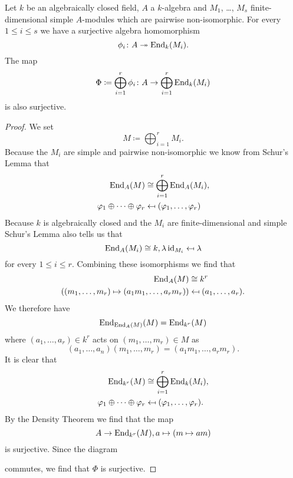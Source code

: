 \begin{lem}\label{lem: map into sum endomorphisms surjective}
 Let $k$ be an algebraically closed field, $A$ a $k$-algebra and $M_1$, \dots, $M_s$ finite-dimensional simple $A$-modules which are pairwise non-isomorphic. For every $1 \leq i \leq s$ we have a surjective algebra homomorphism
 \[
  \phi_i \colon A \twoheadrightarrow \operatorname{End}_k(M_i).
 \]
 The map
 \[
  \Phi \coloneqq \bigoplus_{i=1}^r \phi_i \colon A \to \bigoplus_{i=1}^r \operatorname{End}_k(M_i)
 \]
 is also surjective.
\end{lem}
\begin{proof}
 We set
 \[
  M \coloneqq \bigoplus_{i=1}^r M_i.
 \]
 Because the $M_i$ are simple and pairwise non-isomorphic we know from Schur’s Lemma that
 \begin{align*}
  \operatorname{End}_A(M) &\cong \bigoplus_{i=1}^r \operatorname{End}_A(M_i), \\
  \varphi_1 \oplus \dotsb \oplus \varphi_r &\mapsfrom (\varphi_1, \dotsc, \varphi_r)
 \end{align*}
 Because $k$ is algebraically closed and the $M_i$ are finite-dimensional and simple Schur’s Lemma also tells us that
 \[
  \operatorname{End}_A(M_i) \cong k, \lambda \operatorname{id}_{M_i} \mapsfrom \lambda
 \]
 for every $1 \leq i \leq r$. Combining these isomorphisms we find that
 \begin{align*}
  \operatorname{End}_A(M) &\cong k^r \\
  ((m_1, \dotsc, m_r) \mapsto (a_1 m_1, \dotsc, a_r m_r)) & \mapsfrom (a_1, \dotsc, a_r).
 \end{align*}
 We therefore have
 \[
  \operatorname{End}_{\operatorname{End}_A(M)}(M) = \operatorname{End}_{k^r}(M)
 \]
 where $(a_1, \dotsc, a_r) \in k^r$ acts on $(m_1, \dotsc, m_r) \in M$ as
 \[
  (a_1, \dotsc, a_n)(m_1, \dotsc, m_r) = (a_1 m_1, \dotsc, a_r m_r).
 \]
 It is clear that
 \begin{align*}
  \operatorname{End}_{k^r}(M) &\cong \bigoplus_{i=1}^r \operatorname{End}_k(M_i), \\
  \varphi_1 \oplus \dotsb \oplus \varphi_r &\mapsfrom (\varphi_1, \dotsc, \varphi_r).
 \end{align*}
 By the Density Theorem we find that the map
 \[
  A \to \operatorname{End}_{k^r}(M), a \mapsto (m \mapsto am)
 \]
 is surjective. Since the diagram
 \begin{center}
 \end{center}
 commutes, we find that $\Phi$ is surjective.
\end{proof}


